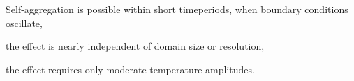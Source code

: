 \documentclass[draft,linenumbers]{agujournal2019}
\begin{document}



\begin{keypoints}
\item Self-aggregation is possible within short timeperiods, when boundary conditions oscillate,
\item the effect is nearly independent of domain size or resolution,
\item the effect requires only moderate temperature amplitudes.
\end{keypoints}

%
%

%
%

\end{document}

